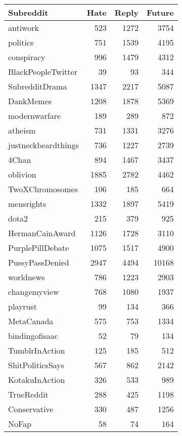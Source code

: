 \documentclass[11pt]{article}
\begin{document}
	
	
	
	\appendix
	
	\begin{table}[ht!]
		\centering
		\small
		\begin{tabular}{lrrr}
			\toprule
			Subreddit & Hate  & Reply & Future\\
			\midrule
			antiwork& 	523	& 1272	& 3754
\\
			politics& 	751	& 1539	& 4195
\\
			conspiracy& 	996	& 1479& 	4312
\\
			BlackPeopleTwitter& 	39	& 93	& 344
\\
			SubredditDrama& 	1347& 	2217& 	5087
\\
			DankMemes& 	1208& 	1878	& 5369
\\
			modernwarfare	& 189	& 289& 	872
\\
			atheism	& 731	& 1331	& 3276
\\
			justneckbeardthings	& 736& 	1227& 	2739
\\
			4Chan& 	894	& 1467	& 3437
\\
			oblivion& 	1885& 	2782& 	4462
\\
			TwoXChromosomes	& 106& 	185& 	664
\\
			mensrights& 	1332& 	1897& 	5419
\\
			dota2	& 215& 	379	& 925
\\
			HermanCainAward& 	1126& 	1728	& 3110
\\
			PurplePillDebate	& 1075& 	1517& 	4900
\\
			PussyPassDenied& 	2947& 	4494& 	10168
\\
			worldnews& 	786& 	1223	& 2903
\\
			changemyview	& 768& 	1080& 	1937
\\
			playrust	& 99& 	134& 	366
\\
			MetaCanada	& 575& 	753& 	1334
\\
			bindingofisaac	& 52& 	79& 	134
\\
			TumblrInAction	& 125& 	185& 	512
\\
			ShitPoliticsSays	& 567& 	862& 	2142
\\
			KotakuInAction	& 326& 	533& 	989
\\
			TrueReddit	& 288& 	425	& 1198
\\
			Conservative	& 330& 	487	& 1256
\\
			NoFap	& 58	& 74& 	164

\end{tabular}
\end{table}
\end{document}
